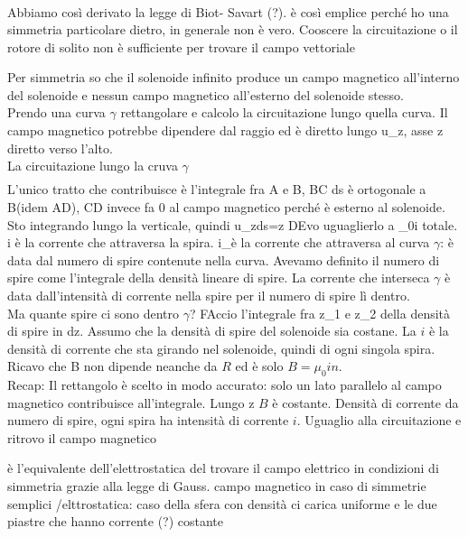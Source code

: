 \begin{equatino*}
\begin{example}
\begin{gather*}
		
	\end{gather*}
	Abbiamo così derivato la legge di Biot- Savart (?). è così emplice perché ho una simmetria particolare dietro, in generale non è vero. Cooscere la circuitazione o il rotore di solito non è sufficiente per trovare il campo vettoriale
\end{example}

\begin{example}
	Per simmetria so che il solenoide infinito produce un campo magnetico all'interno del solenoide e nessun campo magnetico all'esterno del solenoide stesso.\\
	Prendo una curva $\gamma$ rettangolare e calcolo la circuitazione lungo quella curva. Il campo magnetico potrebbe dipendere dal raggio ed è diretto lungo u_z, asse z diretto verso l'alto.\\
	La circuitazione lungo la cruva $\gamma$
		\begin{gather*}
			
			
		\end{gather*}
	L'unico tratto che contribuisce è l'integrale fra A e B, BC ds è ortogonale a B(idem AD), CD invece fa 0 al campo magnetico perché è esterno al solenoide. Sto integrando lungo la verticale, quindi  u_z\dot ds=z
	DEvo uguaglierlo a \mu_0i totale. i è la corrente che attraversa la spira. i_\gamma è la corrente che attraversa al curva $\gamma$: è data dal numero di spire contenute nella curva. Avevamo definito il numero di spire come l'integrale della densità lineare di spire. La corrente che interseca $\gamma$ è data dall'intensità di corrente nella spire per il numero di spire lì dentro.\\
	Ma quante spire ci sono dentro $\gamma$? FAccio l'integrale fra z_1 e z_2 della densità di spire in dz. Assumo che la densità di spire del solenoide sia costane.
	La $i$ è la densità di corrente che sta girando nel solenoide, quindi di ogni singola spira. Ricavo che B non dipende neanche da $R$ ed è solo $B=\mu_0 i n$. \\
	Recap: Il rettangolo è scelto in modo accurato: solo un lato parallelo al campo magnetico contribuisce all'integrale. Lungo z $B$ è costante. Densità di corrente da numero di spire, ogni spira ha intensità di corrente $i$. Uguaglio alla circuitazione e ritrovo il campo magnetico
	
\end{example}

è l'equivalente dell'elettrostatica del trovare il campo elettrico in condizioni di simmetria grazie alla legge di Gauss.
campo magnetico in caso di simmetrie semplici /elttrostatica: caso della sfera con densità ci carica uniforme e le due piastre che hanno corrente (?) costante



\end{equatino*}
